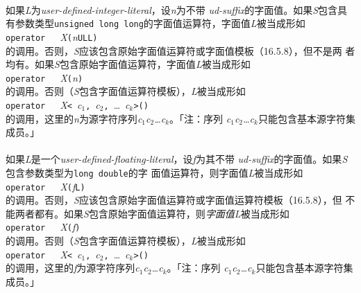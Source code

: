 \paragraph{}
如果\textit{L}为\textit{user-defined-integer-literal}，设\textit{n}为不带
\textit{ud-suffix}的字面值。如果\textit{S}包含具有参数类型\texttt{unsigned long
long}的字面值运算符，字面值\textit{L}被当成形如                               \\
\mbox{\qquad \texttt{operator \dq\dq}\ \
  \textit{X}\texttt{(}\textit{n}\texttt{ULL)}}                                \\
的调用。否则，\textit{S}应该包含原始字面值运算符或字面值模板（16.5.8），但不是两
者均有。如果\textit{S}包含原始字面值运算符，字面值\textit{L}被当成形如        \\
\mbox{\qquad \texttt{operator \dq\dq}\ \
  \textit{X}\texttt{(\dq}\textit{n}\texttt{\dq)}}                         \\
的调用。否则（\textit{S}包含字面值运算符模板），\textit{L}被当成形如          \\
\mbox{\qquad \texttt{operator \dq\dq}\ \ \textit{X}\texttt{<}
  \textit{\sq c$_1$\sq}\texttt{,} \textit{\sq c$_2$\sq}\texttt{,} \ldots
  \textit{\sq c$_k$\sq}\texttt{>()}}                                      \\
的调用，这里的\textit{n}为源字符序列\textit{c$_1$c$_2$\ldots c$_k$}。「注：序列
\textit{c$_1$c$_2$\ldots c$_k$}只能包含基本源字符集成员。」

\paragraph{}
如果\textit{L}是一个\textit{user-defined-floating-literal}，设\textit{f}为其不带
\textit{ud-suffix}的字面值。如果\textit{S}包含参数类型为\texttt{long double}的字
面值运算符，则字面值\textit{L}被当成形如                                      \\
\mbox{\qquad \texttt{operator \dq\dq}\ \
  \textit{X}\texttt{(}\textit{f}\texttt{L)}}                                  \\
的调用。否则，\textit{S}应该包含原始字面值运算符或字面值运算符模板（16.5.8），但
不能两者都有。如果\textit{S}包含原始字面值运算符，则\textit{字面值L}被当成形如\\
\mbox{\qquad \texttt{operator \dq\dq}\ \
  \textit{X}\texttt{(\dq}\textit{f}\texttt{\dq)}}                         \\
的调用。否则（\textit{S}包含字面值运算符模板），\textit{L}被当成形如          \\
\mbox{\qquad \texttt{operator \dq\dq}\ \ \textit{X}\texttt{<}
  \textit{\sq c$_1$\sq}\texttt{,} \textit{\sq c$_2$\sq}\texttt{,} \ldots
  \textit{\sq c$_k$\sq}\texttt{>()}}                                      \\
的调用，这里的\textit{f}为源字符序列\textit{c$_1$c$_2$\ldots c$_k$}。「注：序列
\textit{c$_1$c$_2$\ldots c$_k$}只能包含基本源字符集成员。」

